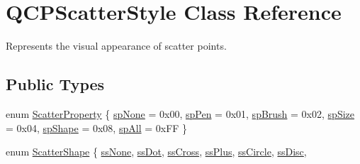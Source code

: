 \hypertarget{class_q_c_p_scatter_style}{}\section{Q\+C\+P\+Scatter\+Style Class Reference}
\label{class_q_c_p_scatter_style}


Represents the visual appearance of scatter points.  


\subsection*{Public Types}
\begin{DoxyCompactItemize}
\item 
enum \hyperlink{class_q_c_p_scatter_style_a8974f6a20f8f6eea7781f0e6af9deb46}{Scatter\+Property} \{ \newline
\hyperlink{class_q_c_p_scatter_style_a8974f6a20f8f6eea7781f0e6af9deb46a5891be10bea382fad6c20f7737a2dd90}{sp\+None} = 0x00, 
\hyperlink{class_q_c_p_scatter_style_a8974f6a20f8f6eea7781f0e6af9deb46aa04d012e7c03e455db2b68fdd55c2a04}{sp\+Pen} = 0x01, 
\hyperlink{class_q_c_p_scatter_style_a8974f6a20f8f6eea7781f0e6af9deb46af0499b1fc04de2dcc7e47ff0ef75c904}{sp\+Brush} = 0x02, 
\hyperlink{class_q_c_p_scatter_style_a8974f6a20f8f6eea7781f0e6af9deb46a553ae95798ace9a328c7cd62045260b0}{sp\+Size} = 0x04, 
\newline
\hyperlink{class_q_c_p_scatter_style_a8974f6a20f8f6eea7781f0e6af9deb46a19c224563adb42c55fb8b7ae6904411b}{sp\+Shape} = 0x08, 
\hyperlink{class_q_c_p_scatter_style_a8974f6a20f8f6eea7781f0e6af9deb46af62509c0409467f387234274762e6f69}{sp\+All} = 0x\+FF
 \}
\item 
enum \hyperlink{class_q_c_p_scatter_style_adb31525af6b680e6f1b7472e43859349}{Scatter\+Shape} \{ \newline
\hyperlink{class_q_c_p_scatter_style_adb31525af6b680e6f1b7472e43859349abd144c291ca274f77053ec68cab6c022}{ss\+None}, 
\hyperlink{class_q_c_p_scatter_style_adb31525af6b680e6f1b7472e43859349a06e15a735b79093a1d999c0374fa3aa1}{ss\+Dot}, 
\hyperlink{class_q_c_p_scatter_style_adb31525af6b680e6f1b7472e43859349a9eacd60f059dc3ef71bf249f515a6fe4}{ss\+Cross}, 
\hyperlink{class_q_c_p_scatter_style_adb31525af6b680e6f1b7472e43859349a2d7f1d3c1a148b9d9d17f2fd9cae5eb7}{ss\+Plus}, 
\newline
\hyperlink{class_q_c_p_scatter_style_adb31525af6b680e6f1b7472e43859349a7c92a110880d0ef2170dff3a5b4f7779}{ss\+Circle}, 
\hyperlink{class_q_c_p_scatter_style_adb31525af6b680e6f1b7472e43859349a281fe1434696dcbab3aa6b9ccfbb09e9}{ss\+Disc}, 

\end{DoxyCompactItemize}
